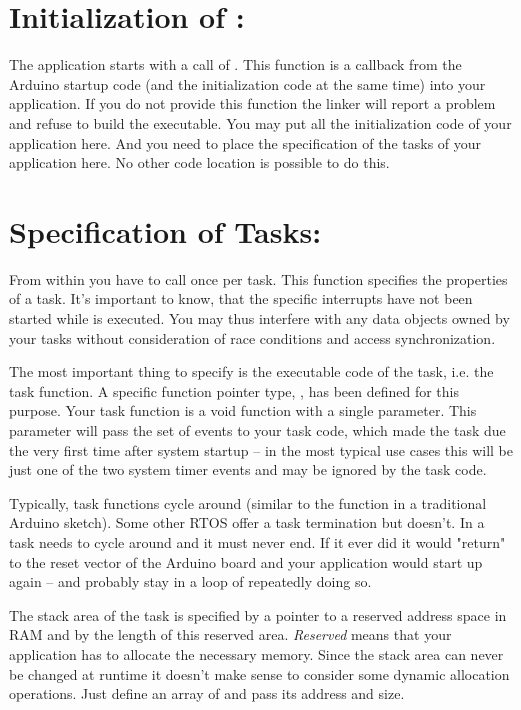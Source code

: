 \section{Initialization of \rtos: }

The \rtos{} application starts with a call of . This function
is a callback from the Arduino startup code (and the \rtos{} initialization
code at the same time) into your application. If you do not provide this
function the linker will report a problem and refuse to build the
executable. You may put all the initialization code of your application
here. And you need to place the specification of the tasks of your
application here. No other code location is possible to do this.


\section{Specification of Tasks: }

From within  you have to call 
once per task. This function specifies the properties of a task. It's
important to know, that the specific \rtos{} interrupts have not been
started while  is executed. You may thus interfere with any
data objects owned by your tasks without consideration of race conditions
and access synchronization.

The most important thing to specify is the executable code of the task,
i.e. the task function. A specific function pointer type,
, has been defined for this purpose. Your
task function is a void function with a single parameter. This parameter
will pass the set of events to your task code, which made the task due the
very first time after system startup -- in the most typical use cases this
will be just one of the two system timer events and may be ignored by the
task code.

Typically, task functions cycle around (similar to the function
 in a traditional Arduino sketch). Some other RTOS offer a
task termination but \rtos{} doesn't. In \rtos{} a task needs to cycle
around and it must never end. If it ever did it would "return" to the reset
vector of the Arduino board and your application would start up again --
and probably stay in a loop of repeatedly doing so.

The stack area of the task is specified by a pointer to a reserved address
space in RAM and by the length of this reserved area. \emph{Reserved} means
that your application has to allocate the necessary memory. Since the
stack area can never be changed at runtime it doesn't make sense to
consider some dynamic allocation operations. Just define an array of
 and pass its address and size.

